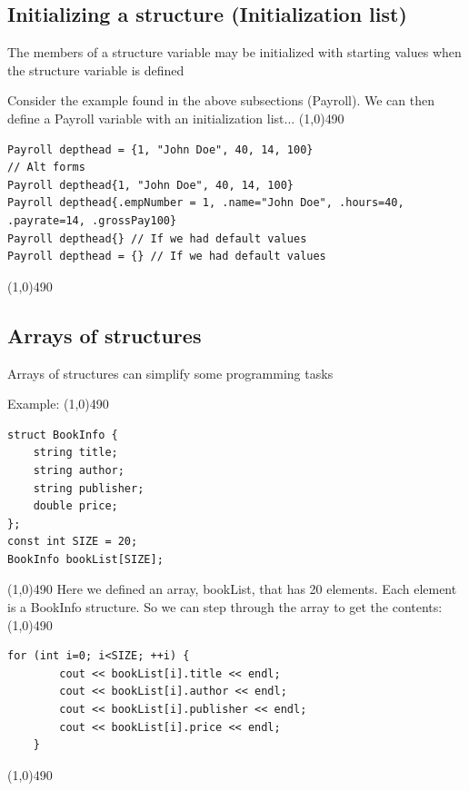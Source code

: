 \documentclass{report}
\begin{document}
	\bigbreak \noindent 
	\subsection{Initializing a structure (Initialization list)}
	\bigbreak \noindent 
	\begin{concept}
	   The members of a structure variable may be initialized with starting values when the structure variable is defined 
	\end{concept}
	\bigbreak \noindent 
	Consider the example found in the above subsections (Payroll). We can then define a Payroll variable with an initialization list...
	\bigbreak \noindent 
	\line(1,0){490}
	\begin{verbatim}
Payroll depthead = {1, "John Doe", 40, 14, 100}
// Alt forms
Payroll depthead{1, "John Doe", 40, 14, 100} 
Payroll depthead{.empNumber = 1, .name="John Doe", .hours=40, .payrate=14, .grossPay100}
Payroll depthead{} // If we had default values
Payroll depthead = {} // If we had default values
	\end{verbatim}
	\line(1,0){490}

	\pagebreak \bigbreak \noindent 
	\subsection{Arrays of structures}
	\bigbreak \noindent 
	\begin{concept}
	   Arrays of structures can simplify some programming tasks 
	\end{concept}
	\bigbreak \noindent 
	Example:
	\bigbreak \noindent 
	\line(1,0){490}
	\begin{verbatim}
struct BookInfo {
    string title;
    string author;
    string publisher;
    double price;
};
const int SIZE = 20;
BookInfo bookList[SIZE];
	\end{verbatim}
	\line(1,0){490}
	\bigbreak \noindent 
	Here we defined an array, bookList, that has 20 elements. Each element is a BookInfo structure.
	\bigbreak \noindent 
	So we can step through the array to get the contents:
	\bigbreak \noindent 
	\line(1,0){490}
	\begin{verbatim}
for (int i=0; i<SIZE; ++i) {
        cout << bookList[i].title << endl;
        cout << bookList[i].author << endl;
        cout << bookList[i].publisher << endl;
        cout << bookList[i].price << endl;
    }
	\end{verbatim}
	\line(1,0){490}
	\bigbreak \noindent 
\end{document}
